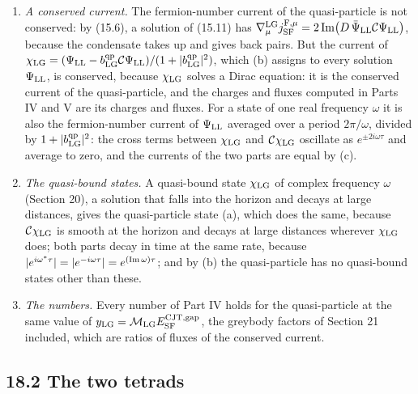 \documentclass[
  10pt,
]{article}
\providecommand{\tightlist}{%
  \setlength{\itemsep}{0pt}\setlength{\parskip}{0pt}}
\begin{document}
\begin{enumerate}
\def\labelenumi{\arabic{enumi}.}
\tightlist
\item
  \emph{A conserved current.} The fermion-number current of the
  quasi-particle is not conserved: by (15.6), a solution of (15.11) has
  \(\nabla^{\rm LG}_\mu j^{{\rm F},\mu}_{\rm SF}=2\,{\rm Im}\big(D\,\bar\Psi_{\rm LL}\mathcal C\Psi_{\rm LL}\big)\),
  because the condensate takes up and gives back pairs. But the current
  of
  \(\chi_{\rm LG}=(\Psi_{\rm LL}-b^{\rm qp}_{\rm LG}\mathcal C\Psi_{\rm LL})/(1+\lvert b^{\rm qp}_{\rm LG}\rvert^2)\),
  which (b) assigns to every solution \(\Psi_{\rm LL}\), is conserved,
  because \(\chi_{\rm LG}\) solves a Dirac equation: it is the conserved
  current of the quasi-particle, and the charges and fluxes computed in
  Parts IV and V are its charges and fluxes. For a state of one real
  frequency \(\omega\) it is also the fermion-number current of
  \(\Psi_{\rm LL}\) averaged over a period \(2\pi/\omega\), divided by
  \(1+\lvert b^{\rm qp}_{\rm LG}\rvert^2\): the cross terms between
  \(\chi_{\rm LG}\) and \(\mathcal C\chi_{\rm LG}\) oscillate as
  \(e^{\pm2i\omega\tau}\) and average to zero, and the currents of the
  two parts are equal by (c).
\item
  \emph{The quasi-bound states.} A quasi-bound state \(\chi_{\rm LG}\)
  of complex frequency \(\omega\) (Section 20), a solution that falls
  into the horizon and decays at large distances, gives the
  quasi-particle state (a), which does the same, because
  \(\mathcal C\chi_{\rm LG}\) is smooth at the horizon and decays at
  large distances wherever \(\chi_{\rm LG}\) does; both parts decay in
  time at the same rate, because
  \(\lvert e^{i\omega^*\tau}\rvert=\lvert e^{-i\omega\tau}\rvert=e^{({\rm Im}\,\omega)\tau}\);
  and by (b) the quasi-particle has no quasi-bound states other than
  these.
\item
  \emph{The numbers.} Every number of Part IV holds for the
  quasi-particle at the same value of
  \(y_{\rm LG}=\mathcal M_{\rm LG}E^{\rm CJT,gap}_{\rm SF}\), the
  greybody factors of Section 21 included, which are ratios of fluxes of
  the conserved current.
\end{enumerate}

\hypertarget{the-two-tetrads}{%
\subsection{18.2 The two tetrads}\label{the-two-tetrads}}
\end{document}

